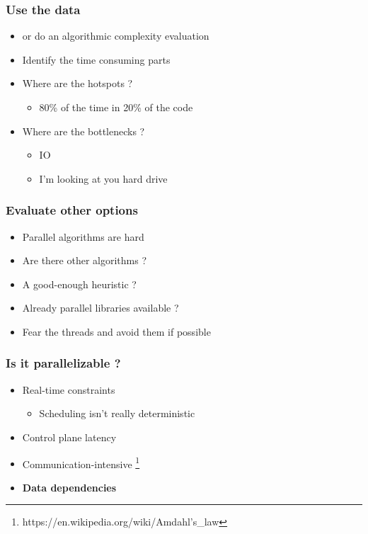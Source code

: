 \begin{frame}
  \frametitle{Use the data}
  \begin{itemize}
  \item or do an algorithmic complexity evaluation
  \item Identify the time consuming parts
  \item Where are the hotspots ?
    \begin{itemize}
    \item 80\% of the time in 20\% of the code
    \end{itemize}
  \item Where are the bottlenecks ?
    \begin{itemize}
    \item IO
    \item I'm looking at you hard drive
    \end{itemize}
  \end{itemize}
\end{frame}

\begin{frame}
  \frametitle{Evaluate other options}

  \begin{itemize}
  \item Parallel algorithms are hard
  \item Are there other algorithms ?
  \item A good-enough heuristic ?
  \item Already parallel libraries available ?
  \item Fear the threads and avoid them if possible
  \end{itemize}
\end{frame}

\begin{frame}
  \frametitle{Is it parallelizable ?}

  \begin{itemize}
  \item Real-time constraints
    \begin{itemize}
    \item Scheduling isn't really deterministic
    \end{itemize}
  \item Control plane latency
  \item Communication-intensive \footnote{https://en.wikipedia.org/wiki/Amdahl's\_law}
  \item \textbf{Data dependencies}
  \end{itemize}
\end{frame}

